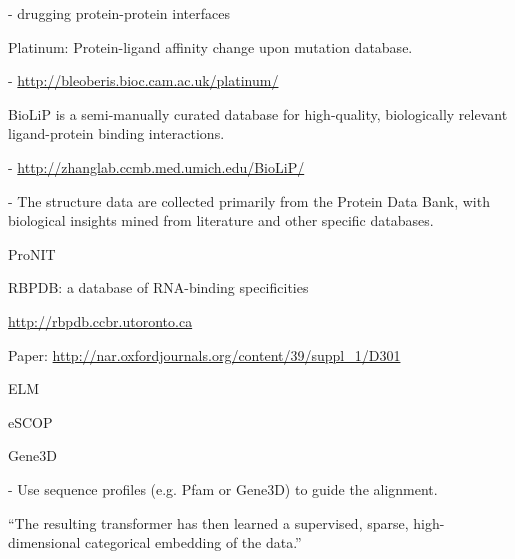 - drugging protein-protein interfaces \cite{wells_reaching_2007}

Platinum: Protein-ligand affinity change upon mutation database.

- \url{http://bleoberis.bioc.cam.ac.uk/platinum/}

BioLiP is a semi-manually curated database for high-quality, biologically relevant ligand-protein binding interactions.

- \url{http://zhanglab.ccmb.med.umich.edu/BioLiP/}

- The structure data are collected primarily from the Protein Data Bank, with biological insights mined from literature and other specific databases.


ProNIT

RBPDB: a database of RNA-binding specificities

\url{http://rbpdb.ccbr.utoronto.ca}

Paper: \url{http://nar.oxfordjournals.org/content/39/suppl_1/D301}


ELM




eSCOP

Gene3D

- Use sequence profiles (e.g. Pfam or Gene3D) to guide the alignment.

``The resulting transformer has then learned a supervised, sparse, high-dimensional categorical embedding of the data.''



